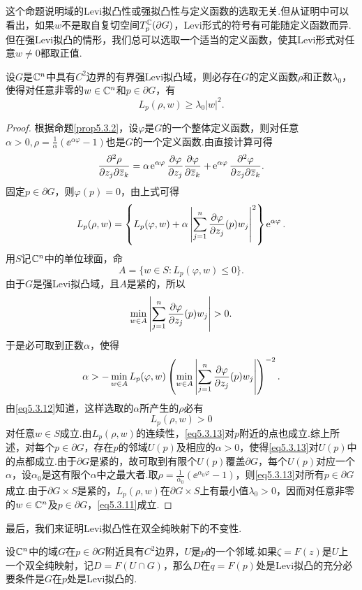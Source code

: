 这个命题说明域的Levi拟凸性或强拟凸性与定义函数的选取无关.但从证明中可以看出，如果$w$不是取自复切空间$T_p^\mathbb C(\partial G)$，Levi形式的符号有可能随定义函数而异.但在强Levi拟凸的情形，我们总可以选取一个适当的定义函数，使其Levi形式对任意$w\neq0$都取正值.
\begin{theorem}\label{thm5.3.13}
	设$G$是$\mathbb C^n$中具有$C^2$边界的有界强Levi拟凸域，则必存在$G$的定义函数$\rho$和正数$\lambda_0$，使得对任意非零的$w\in\mathbb C^n$和$p\in\partial G$，有
	\begin{equation}\label{eq5.3.11}
		L_p(\rho,w)\ge\lambda_0|w|^2.
	\end{equation}
\end{theorem}
\begin{proof}
	根据命题\ref{prop5.3.2}，设$\varphi$是$G$的一个整体定义函数，则对任意$\alpha>0,\rho=\frac1\alpha (\ee^{\alpha\varphi}-1)$也是$G$的一个定义函数.由直接计算可得
	\[\frac{\partial^2 \rho}{\partial z_j\partial {}\mkern1mu\overline{\mkern-1muz}_k}=\alpha\operatorname{\!\!\;\mathrm e}^{\alpha\varphi}\frac{\partial \varphi}{\partial z_j}\frac{\partial \varphi}{\partial {}\mkern1mu\overline{\mkern-1muz}_k}+\operatorname{\!\!\;\mathrm e}^{\alpha\varphi}\frac{\partial^2 \varphi}{\partial z_j\partial {}\mkern1mu\overline{\mkern-1muz}_k}.\]
	固定$p\in\partial G$，则$\varphi(p)=0$，由上式可得
	\begin{equation}\label{eq5.3.12}
		L_p(\rho,w)=\left\{L_p(\varphi,w)+\alpha\left|\sum_{j=1}^{n}\frac{\partial \varphi}{\partial z_j}(p)w_j\right|^2\right\}\operatorname{\!\!\;\mathrm e}^{\alpha\varphi}.
	\end{equation}
用$S$记$\mathbb C^n$中的单位球面，命
\[A=\{w\in S\colon L_p(\varphi,w)\le0\}.\]
由于$G$是强Levi拟凸域，且$A$是紧的，所以
\[\min_{w\in A}\left|\sum_{j=1}^{n}\pp{\varphi}{z_j}(p)w_j\right|>0.\]
于是必可取到正数$\alpha$，使得
\[\alpha>-\min_{w\in A} L_p(\varphi,w)\left(\min_{w\in A}\left|\sum_{j=1}^{n}\frac{\partial \varphi}{\partial z_j}(p)w_j\right|\right)^{-2}.\]
由\eqref{eq5.3.12}知道，这样选取的$\alpha$所产生的$\rho$必有
\begin{equation}\label{eq5.3.13}
	L_p(\rho,w)>0
\end{equation}
对任意$w\in S$成立.由$L_p(\rho,w)$的连续性，\eqref{eq5.3.13}对$p$附近的点也成立.综上所述，对每个$p\in\partial G$，存在$p$的邻域$U(p)$及相应的$\alpha>0$，使得\eqref{eq5.3.13}对$U(p)$中的点都成立.由于$\partial G$是紧的，故可取到有限个$U(p)$覆盖$\partial G$，每个$U(p)$对应一个$\alpha$，设$\alpha_0$是这有限个$\alpha$中之最大者.取$\rho=\frac1{\alpha_0}(\ee^{\alpha_0\varphi}-1)$，则\eqref{eq5.3.13}对所有$p\in\partial G$成立.由于$\partial G\times S$是紧的，$L_p(\rho,w)$在$\partial G\times S$上有最小值$\lambda_0>0$，因而对任意非零的$w\in\mathbb C^n$及$p\in\partial G$，\eqref{eq5.3.11}成立.
\end{proof}
最后，我们来证明Levi拟凸性在双全纯映射下的不变性.
\begin{prop}\label{prop5.3.14}
	设$\mathbb C^n$中的域$G$在$p\in\partial G$附近具有$C^2$边界，$U$是$p$的一个邻域.如果$\zeta=F(z)$是$U$上一个双全纯映射，记$D=F(U\cap G)$，那么$D$在$q=F(p)$处是Levi拟凸的充分必要条件是$G$在$p$处是Levi拟凸的.
\end{prop}
